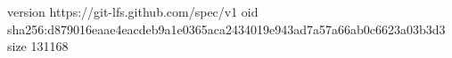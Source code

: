 version https://git-lfs.github.com/spec/v1
oid sha256:d879016eaae4eacdeb9a1e0365aca2434019e943ad7a57a66ab0c6623a03b3d3
size 131168
